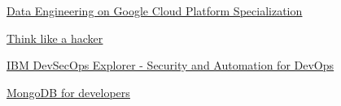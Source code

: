 %
%
%


\begin{coursework}
        {\href{https://www.coursera.org/account/accomplishments/specialization/certificate/3MKRH4BJ5MKQ}
        {\underline{Data Engineering on Google Cloud Platform Specialization}}}



        {\href{https://www.credly.com/badges/f2c1a7dc-86fe-473e-b5ec-018a981857f8}
        {\underline{Think like a hacker}}}

        {\href{https://www.credly.com/badges/c8708073-0350-4599-8285-fb6af65a12ea}
        {\underline{IBM DevSecOps Explorer - Security and Automation for DevOps}}}



        {\href{https://university.mongodb.com/course_completion/30f19185172f43e58ae4a0cd9ce13ff0}
        {\underline{MongoDB for developers}}}





\end{coursework}
